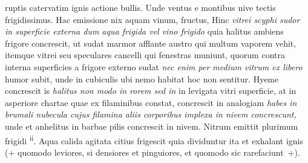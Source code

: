  ruptis catervatim ignis actione bullis. Unde ventus e montibus nive\protect{} tectis frigidissimus. Hac emissione nix aquam vinum\protect{}, fructus\protect{},  Hinc \textit{vitrei scyphi\protect{} sudor in superficie externa dum aqua frigida vel vino frigido } quia halitus ambiens frigore concrescit, ut sudat marmor\protect{} afflante austro qui multum vaporem\protect{} vehit, itemque vitrei seu speculares\protect{} cancelli qui fenestras\protect{} muniunt, quorum contra interna superficies\protect{} a frigore externo\protect{} sudat
\textit{nec enim per medium vitrum ex libero } humor subit, unde in cubiculis\protect{} ubi nemo habitat hoc non sentitur. Hyeme concrescit is \textit{halitus non modo in rorem sed in } in levigata vitri\protect{} superficie, at in asperiore chartae quae ex filaminibus constat, concrescit in  analogiam \textit{habes in brumali nubecula\protect{} cujus filamina aliis corporibus implexa in nivem concrescunt,} unde et anhelitus\protect{} in barbae pilis concrescit in nivem. Nitrum\protect{} emittit plurimum frigidi \mercury\textsuperscript{ii}. Aqua calida\protect{} agitata citius frigescit quia dividuntur ita et exhalant ignis  (+ quomodo leviores, si densiores et pinguiores, et quomodo sic rarefaciunt~+).

